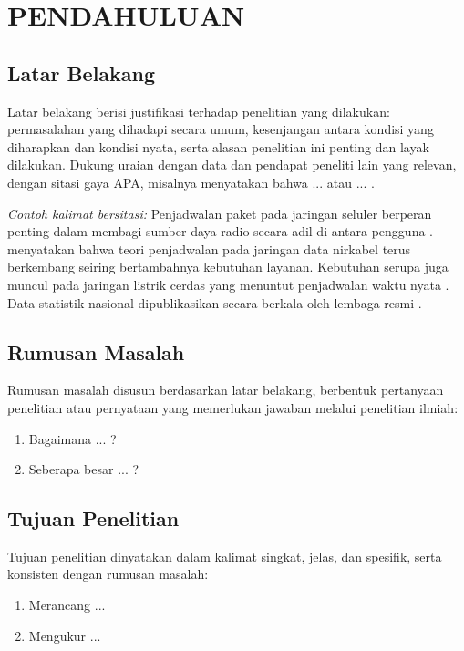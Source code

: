 \chapter{PENDAHULUAN}

\section{Latar Belakang}
Latar belakang berisi justifikasi terhadap penelitian yang dilakukan: permasalahan yang dihadapi secara umum, kesenjangan antara kondisi yang diharapkan dan kondisi nyata, serta alasan penelitian ini penting dan layak dilakukan. Dukung uraian dengan data dan pendapat peneliti lain yang relevan, dengan sitasi gaya APA, misalnya \textcite{andrews2007} menyatakan bahwa ... atau ... \parencite{capozzi2013}.

\textit{Contoh kalimat bersitasi:} Penjadwalan paket pada jaringan seluler berperan penting dalam membagi sumber daya radio secara adil di antara pengguna \parencite{capozzi2013}. \textcite{andrews2007} menyatakan bahwa teori penjadwalan pada jaringan data nirkabel terus berkembang seiring bertambahnya kebutuhan layanan. Kebutuhan serupa juga muncul pada jaringan listrik cerdas yang menuntut penjadwalan waktu nyata \parencite{xu2012}. Data statistik nasional dipublikasikan secara berkala oleh lembaga resmi \parencite{bps1997}.

\section{Rumusan Masalah}
Rumusan masalah disusun berdasarkan latar belakang, berbentuk pertanyaan penelitian atau pernyataan yang memerlukan jawaban melalui penelitian ilmiah:
\begin{enumerate}
\item Bagaimana ... ?
\item Seberapa besar ... ?
\end{enumerate}

\section{Tujuan Penelitian}
Tujuan penelitian dinyatakan dalam kalimat singkat, jelas, dan spesifik, serta konsisten dengan rumusan masalah:
\begin{enumerate}
\item Merancang ...
\item Mengukur ...
\end{enumerate}

